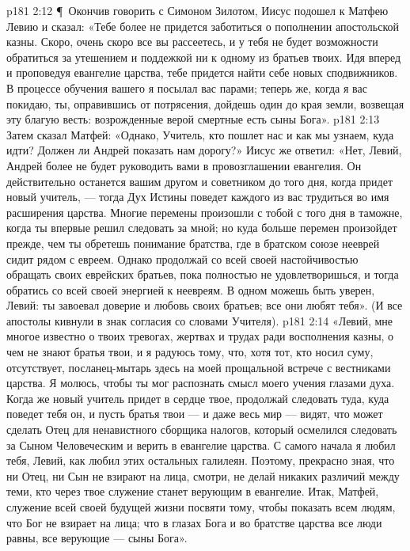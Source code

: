 \vs p181 2:12 \P\ Окончив говорить с Симоном Зилотом, Иисус подошел к Матфею Левию и сказал: «Тебе более не придется заботиться о пополнении апостольской казны. Скоро, очень скоро все вы рассеетесь, и у тебя не будет возможности обратиться за утешением и поддежкой ни к одному из братьев твоих. Идя вперед и проповедуя евангелие царства, тебе придется найти себе новых сподвижников. В процессе обучения вашего я посылал вас парами; теперь же, когда я вас покидаю, ты, оправившись от потрясения, дойдешь один до края земли, возвещая эту благую весть: возрожденные верой смертные есть сыны Бога».
\vs p181 2:13 Затем сказал Матфей: «Однако, Учитель, кто пошлет нас и как мы узнаем, куда идти? Должен ли Андрей показать нам дорогу?» Иисус же ответил: «Нет, Левий, Андрей более не будет руководить вами в провозглашении евангелия. Он действительно останется вашим другом и советником до того дня, когда придет новый учитель, --- тогда Дух Истины поведет каждого из вас трудиться во имя расширения царства. Многие перемены произошли с тобой с того дня в таможне, когда ты впервые решил следовать за мной; но куда больше перемен произойдет прежде, чем ты обретешь понимание братства, где в братском союзе нееврей сидит рядом с евреем. Однако продолжай со всей своей настойчивостью обращать своих еврейских братьев, пока полностью не удовлетворишься, и тогда обратись со всей своей энергией к неевреям. В одном можешь быть уверен, Левий: ты завоевал доверие и любовь своих братьев; все они любят тебя». (И все апостолы кивнули в знак согласия со словами Учителя).
\vs p181 2:14 «Левий, мне многое известно о твоих тревогах, жертвах и трудах ради восполнения казны, о чем не знают братья твои, и я радуюсь тому, что, хотя тот, кто носил суму, отсутствует, посланец\hyp{}мытарь здесь на моей прощальной встрече с вестниками царства. Я молюсь, чтобы ты мог распознать смысл моего учения глазами духа. Когда же новый учитель придет в сердце твое, продолжай следовать туда, куда поведет тебя он, и пусть братья твои --- и даже весь мир --- видят, что может сделать Отец для ненавистного сборщика налогов, который осмелился следовать за Сыном Человеческим и верить в евангелие царства. С самого начала я любил тебя, Левий, как любил этих остальных галилеян. Поэтому, прекрасно зная, что ни Отец, ни Сын не взирают на лица, смотри, не делай никаких различий между теми, кто через твое служение станет верующим в евангелие. Итак, Матфей, служение всей своей будущей жизни посвяти тому, чтобы показать всем людям, что Бог не взирает на лица; что в глазах Бога и во братстве царства все люди равны, все верующие --- сыны Бога».
